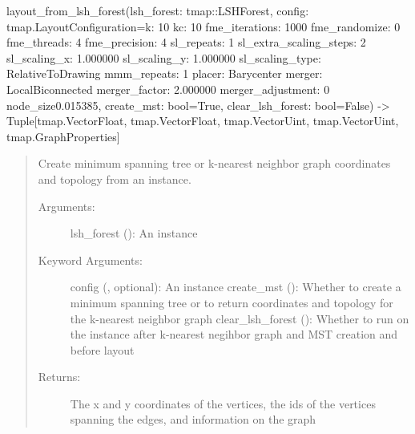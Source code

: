 \documentclass[letterpaper,10pt,english]{sphinxmanual}
\begin{document}
\begin{fulllineitems}
\label{\detokenize{documentation:tmap.layout_from_lsh_forest}}
layout\_from\_lsh\_forest(lsh\_forest: tmap::LSHForest, config: tmap.LayoutConfiguration=k: 10
kc: 10
fme\_iterations: 1000
fme\_randomize: 0
fme\_threads: 4
fme\_precision: 4
sl\_repeats: 1
sl\_extra\_scaling\_steps: 2
sl\_scaling\_x: 1.000000
sl\_scaling\_y: 1.000000
sl\_scaling\_type: RelativeToDrawing
mmm\_repeats: 1
placer: Barycenter
merger: LocalBiconnected
merger\_factor: 2.000000
merger\_adjustment: 0
node\_size0.015385, create\_mst: bool=True, clear\_lsh\_forest: bool=False) -\textgreater{} Tuple{[}tmap.VectorFloat, tmap.VectorFloat, tmap.VectorUint, tmap.VectorUint, tmap.GraphProperties{]}
\begin{quote}

Create minimum spanning tree or k-nearest neighbor graph coordinates and topology from an {\hyperref[\detokenize{documentation:tmap.LSHForest}]{}} instance.
\begin{description}
\item[{Arguments:}] \leavevmode
lsh\_forest ({\hyperref[\detokenize{documentation:tmap.LSHForest}]{}}): An {\hyperref[\detokenize{documentation:tmap.LSHForest}]{}} instance

\item[{Keyword Arguments:}] \leavevmode
config ({\hyperref[\detokenize{documentation:tmap.LayoutConfiguration}]{}}, optional): An {\hyperref[\detokenize{documentation:tmap.LayoutConfiguration}]{}} instance
create\_mst (): Whether to create a minimum spanning tree or to return coordinates and topology for the k-nearest neighbor graph
clear\_lsh\_forest (): Whether to run  on the {\hyperref[\detokenize{documentation:tmap.LSHForest}]{}} instance after k-nearest negihbor graph and MST creation and before layout

\item[{Returns:}] \leavevmode
{} The x and y coordinates of the vertices, the ids of the vertices spanning the edges, and information on the graph

\end{description}
\end{quote}

\end{fulllineitems}
\end{document}
